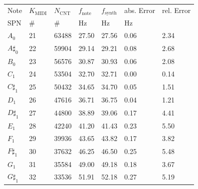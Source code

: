 \begin{tabularx}{\textwidth}{YYYYYYY}
	\toprule
	Note          & $K_\text{MIDI}$ & $N_\text{CNT}$ & $f_\text{note}$ & $f_\text{synth}$ & abs. Error  & rel. Error   \\
	\acs{SPN}     & \#              & \#             & \si{\hertz}     & \si{\hertz}      & \si{\hertz} & \si{\permil} \\ \midrule
	$A_{0}$       & 21              & 63488          & 27.50           & 27.56            & 0.06        & 2.34         \\
	$A\sharp_{0}$ & 22              & 59904          & 29.14           & 29.21            & 0.08        & 2.68         \\
	$B_{0}$       & 23              & 56576          & 30.87           & 30.93            & 0.06        & 2.08         \\
	$C_{1}$       & 24              & 53504          & 32.70           & 32.71            & 0.00        & 0.14         \\
	$C\sharp_{1}$ & 25              & 50432          & 34.65           & 34.70            & 0.05        & 1.51         \\
	$D_{1}$       & 26              & 47616          & 36.71           & 36.75            & 0.04        & 1.21         \\
	$D\sharp_{1}$ & 27              & 44800          & 38.89           & 39.06            & 0.17        & 4.41         \\
	$E_{1}$       & 28              & 42240          & 41.20           & 41.43            & 0.23        & 5.50         \\
	$F_{1}$       & 29              & 39936          & 43.65           & 43.82            & 0.17        & 3.82         \\
	$F\sharp_{1}$ & 30              & 37632          & 46.25           & 46.50            & 0.25        & 5.48         \\
	$G_{1}$       & 31              & 35584          & 49.00           & 49.18            & 0.18        & 3.67         \\
	$G\sharp_{1}$ & 32              & 33536          & 51.91           & 52.18            & 0.27        & 5.19         \\
	\bottomrule
\end{tabularx}